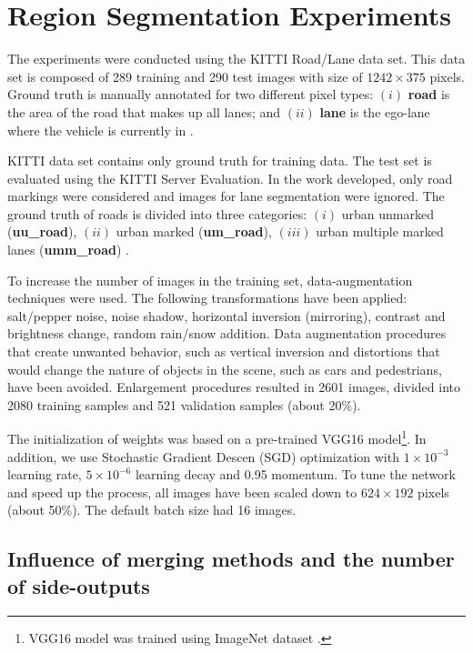 \section{Region Segmentation Experiments}
\label{cap6_result_experm_1}

The experiments were conducted using the KITTI Road/Lane data set.
This data set is composed of 289 training and 290 test images with size of $1242 \times 375$ pixels. 
Ground truth is manually annotated for two different pixel types: $(i)$ \textbf{road} is the area of the road that makes up all lanes; and $(ii)$ \textbf{lane} is the ego-lane where the vehicle is currently in \cite{Fritsch2013ITSC}.

KITTI data set contains only ground truth for training data.
The test set is evaluated using the KITTI Server Evaluation.
In the work developed, only road markings were considered and images for lane segmentation were ignored.
The ground truth of roads is divided into three categories: $(i)$ urban unmarked (\textbf{uu\_road}), $(ii)$ urban marked (\textbf{um\_road}), $(iii)$ urban multiple marked lanes (\textbf{umm\_road}) \cite{Fritsch2013ITSC}.

To increase the number of images in the training set, data-augmentation techniques were used.
The following transformations have been applied: salt/pepper noise, noise shadow, horizontal inversion (mirroring), contrast and brightness change, random rain/snow addition.
Data augmentation procedures that create unwanted behavior, such as vertical inversion and distortions that would change the nature of objects in the scene, such as cars and pedestrians, have been avoided.
Enlargement procedures resulted in 2601 images, divided into 2080 training samples and 521 validation samples (about 20\%).

The initialization of weights was based on a pre-trained VGG16 model\footnote{VGG16 model was trained using ImageNet dataset \cite{ILSVRC15}.}.
In addition, we use Stochastic Gradient Descen (SGD) optimization with $1 \times 10^{-3}$ learning rate, $5 \times 10^{-6}$ learning decay and 0.95 momentum.
To tune the network and speed up the process, all images have been scaled down to $624 \times 192$ pixels (about 50\%). 
The default batch size had 16 images.

\subsection{Influence of merging methods and the number of side-outputs}
\label{cap6_experm_1_qtd_saidas}

